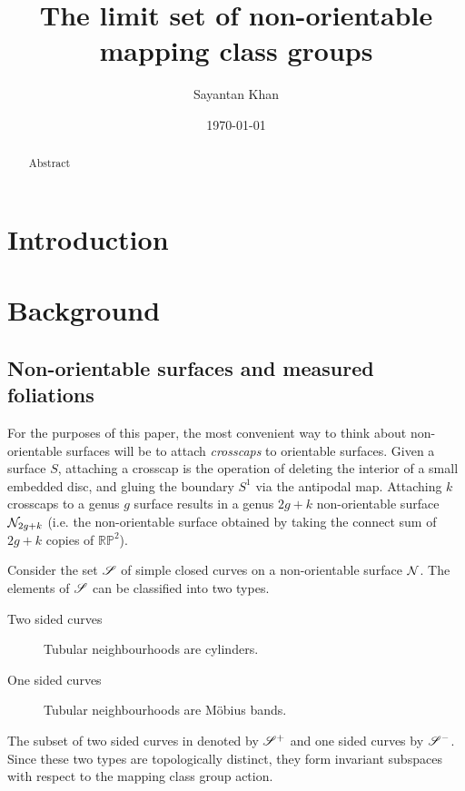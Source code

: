 \documentclass[12pt, reqno]{amsart}
\title{The limit set of non-orientable mapping class groups}
\author{Sayantan Khan}
\date{\today}
\begin{document}
\begin{abstract}
  Abstract
\end{abstract}
\maketitle

\tableofcontents

\section{Introduction}
\label{sec:introduction}

\section{Background}
\label{sec:background}

\subsection{Non-orientable surfaces and measured foliations}
\label{sec:backgr-meas-foli}

For the purposes of this paper, the most convenient way to think about non-orientable surfaces will be to attach \emph{crosscaps} to orientable surfaces.
Given a surface $S$, attaching a crosscap is the operation of deleting the interior of a small embedded disc, and gluing the boundary $S^1$ via the antipodal map.
Attaching $k$ crosscaps to a genus $g$ surface results in a genus $2g+k$ non-orientable surface $\mathcal{N}_{2g+k}$ (i.e. the non-orientable surface obtained by taking the connect sum of $2g+k$ copies of $\mathbb{RP}^2$).

Consider the set $\mathscr{S}$ of simple closed curves on a non-orientable surface $\mathcal{N}$.
The elements of $\mathscr{S}$ can be classified into two types.
\begin{description}
\item[Two sided curves] Tubular neighbourhoods are cylinders.
\item[One sided curves] Tubular neighbourhoods are Möbius bands.
\end{description}
The subset of two sided curves in denoted by $\mathscr{S}^+$ and one sided curves by $\mathscr{S}^-$.
Since these two types are topologically distinct, they form invariant subspaces with respect to the mapping class group action.
\end{document}
